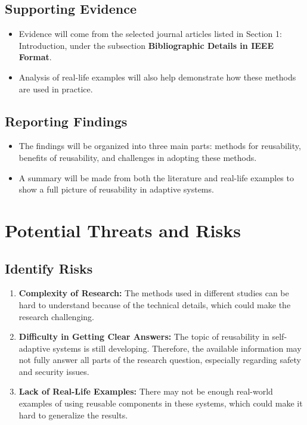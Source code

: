 \documentclass[a4paper, 12pt]{article}
\begin{document}
\subsection*{Supporting Evidence}
\begin{itemize}
    \item Evidence will come from the selected journal articles listed in Section 1: Introduction, under the subsection \textbf{Bibliographic Details in IEEE Format}.
    \item Analysis of real-life examples will also help demonstrate how these methods are used in practice.
\end{itemize}


\subsection*{Reporting Findings}
\begin{itemize}
    \item The findings will be organized into three main parts: methods for reusability, benefits of reusability, and challenges in adopting these methods.
    \item A summary will be made from both the literature and real-life examples to show a full picture of reusability in adaptive systems.
\end{itemize}


\section{Potential Threats and Risks}
\subsection*{Identify Risks}
\begin{enumerate}
    \item \textbf{Complexity of Research:} The methods used in different studies can be hard to understand because of the technical details, which could make the research challenging.
    \item \textbf{Difficulty in Getting Clear Answers:} The topic of reusability in self-adaptive systems is still developing. Therefore, the available information may not fully answer all parts of the research question, especially regarding safety and security issues.
    \item \textbf{Lack of Real-Life Examples:} There may not be enough real-world examples of using reusable components in these systems, which could make it hard to generalize the results.
\end{enumerate}
\end{document}
